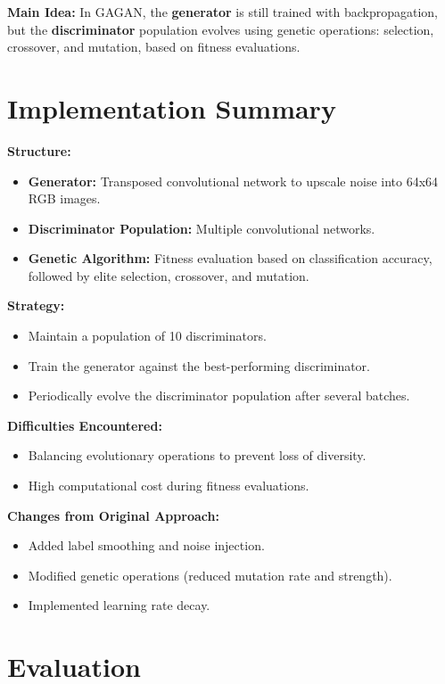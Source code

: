 \documentclass[12pt]{article}
\begin{document}
\textbf{Main Idea:} In GAGAN, the \textbf{generator} is still trained with backpropagation, but the \textbf{discriminator} population evolves using genetic operations: selection, crossover, and mutation, based on fitness evaluations.

\section{Implementation Summary}
\textbf{Structure:}
\begin{itemize}
    \item \textbf{Generator:} Transposed convolutional network to upscale noise into 64x64 RGB images.
    \item \textbf{Discriminator Population:} Multiple convolutional networks.
    \item \textbf{Genetic Algorithm:} Fitness evaluation based on classification accuracy, followed by elite selection, crossover, and mutation.
\end{itemize}

\textbf{Strategy:}
\begin{itemize}
    \item Maintain a population of 10 discriminators.
    \item Train the generator against the best-performing discriminator.
    \item Periodically evolve the discriminator population after several batches.
\end{itemize}

\textbf{Difficulties Encountered:}
\begin{itemize}
    \item Balancing evolutionary operations to prevent loss of diversity.
    \item High computational cost during fitness evaluations.
\end{itemize}

\textbf{Changes from Original Approach:}
\begin{itemize}
    \item Added label smoothing and noise injection.
    \item Modified genetic operations (reduced mutation rate and strength).
    \item Implemented learning rate decay.
\end{itemize}

\section{Evaluation}
\end{document}
